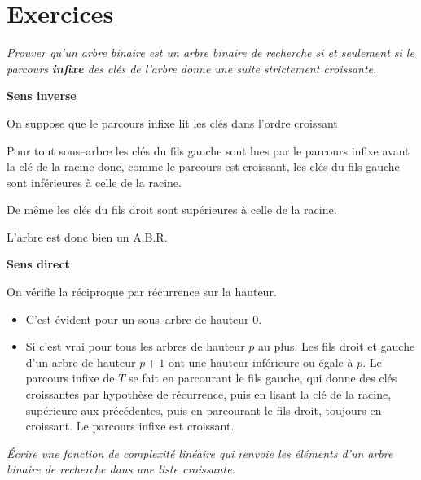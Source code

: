 \section{Exercices}
\begin{Exercise}[title =Une caractérisation]\it
Prouver qu'un arbre binaire est un arbre binaire de recherche si et seulement si le parcours {\bf infixe} des clés de l'arbre donne une suite strictement croissante.
\end{Exercise}
\begin{Answer}

{\bf Sens inverse}

On suppose que le parcours infixe lit les clés dans l'ordre croissant

Pour tout sous--arbre les clés du fils gauche sont lues par le parcours infixe avant la clé de la racine donc, comme le parcours est croissant, les clés du fils gauche sont inférieures à celle de la racine. 

De même les clés du fils droit sont supérieures à celle de la racine.

L'arbre est donc bien un A.B.R.

{\bf Sens direct}


On vérifie la réciproque par récurrence sur la hauteur.

\begin{itemize}
\item C'est évident pour un sous--arbre de hauteur 0.

\item Si c'est vrai pour tous les arbres de hauteur $p$ au plus.
Les  fils droit et gauche  d'un arbre de hauteur $p+1$ ont une hauteur inférieure ou égale à $p$. Le parcours infixe de $T$ se fait en parcourant le fils gauche, qui donne des clés croissantes par hypothèse de récurrence, puis en lisant la clé de la racine, supérieure aux précédentes, puis en parcourant le fils droit, toujours en croissant.
Le parcours infixe est croissant.

\end{itemize}
\end{Answer}
\begin{Exercise}[title =Parcours infixe]\it
Écrire une fonction de complexité linéaire qui renvoie  les éléments d'un arbre binaire de recherche dans une liste croissante.
\end{Exercise}
